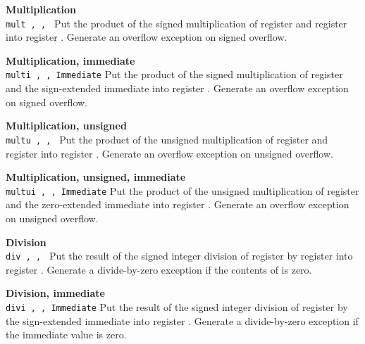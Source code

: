 \noindent
{\bf Multiplication}\\
\noindent
\texttt{mult \regd, \regs, \regt}
Put the product of the signed multiplication of register \regs{} and register \regt{}
into register \regd{}. Generate an overflow exception on signed overflow.
\vspace{3ex}

\noindent
{\bf Multiplication, immediate}\\
\noindent
\texttt{multi \regd, \regs, Immediate}
Put the product of the signed multiplication of register \regs{} and the sign-extended immediate
into register \regd{}. Generate an overflow exception on signed overflow.
\vspace{3ex}

\noindent
{\bf Multiplication, unsigned}\\
\noindent
\texttt{multu \regd, \regs, \regt}
Put the product of the unsigned multiplication of register \regs{} and register \regt{}
into register \regd{}. Generate an overflow exception on unsigned overflow.
\vspace{3ex}

\noindent
{\bf Multiplication, unsigned, immediate}\\
\noindent
\texttt{multui \regd, \regs, Immediate}
Put the product of the unsigned multiplication of register \regs{} and the zero-extended immediate
into register \regd{}. Generate an overflow exception on unsigned overflow.
\vspace{3ex}
\newpage

\noindent
{\bf Division}\\
\noindent
\texttt{div \regd, \regs, \regt}
Put the result of the signed integer division of register \regs{} by register \regt{}
into register \regd{}. Generate a divide-by-zero exception if the contents of \regt{} is zero.
\vspace{3ex}

\noindent
{\bf Division, immediate}\\
\noindent
\texttt{divi \regd, \regs, Immediate}
Put the result of the signed integer division of register \regs{} by the sign-extended immediate
into register \regd{}. Generate a divide-by-zero exception if the immediate value is zero.
\vspace{3ex}

